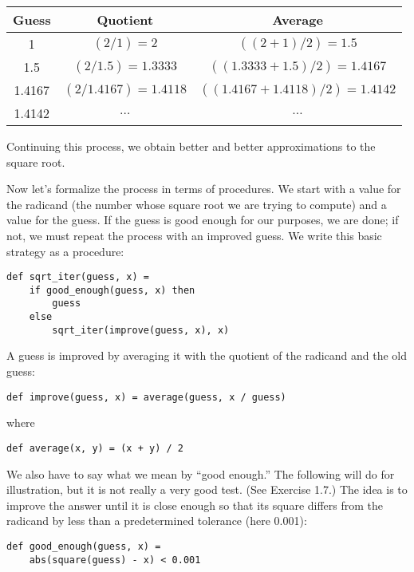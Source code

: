 \begin{center}
\begin{tabular}{|c|c|c|}
\hline
Guess & Quotient & Average \\
\hline
1 & $(2/1) = 2$ & $((2 + 1)/2) = 1.5$ \\
1.5 & $(2/1.5) = 1.3333$ & $((1.3333 + 1.5)/2) = 1.4167$ \\
1.4167 & $(2/1.4167) = 1.4118$ & $((1.4167 + 1.4118)/2) = 1.4142$ \\
1.4142 & $\ldots$ & $\ldots$ \\
\hline
\end{tabular}
\end{center}

Continuing this process, we obtain better and better approximations to the square root.

Now let's formalize the process in terms of procedures. We start with a value for the radicand (the number whose square root we are trying to compute) and a value for the guess. If the guess is good enough for our purposes, we are done; if not, we must repeat the process with an improved guess. We write this basic strategy as a procedure:

\begin{lstlisting}
def sqrt_iter(guess, x) =
    if good_enough(guess, x) then
        guess
    else
        sqrt_iter(improve(guess, x), x)
\end{lstlisting}

A guess is improved by averaging it with the quotient of the radicand and the old guess:

\begin{lstlisting}
def improve(guess, x) = average(guess, x / guess)
\end{lstlisting}

where

\begin{lstlisting}
def average(x, y) = (x + y) / 2
\end{lstlisting}

We also have to say what we mean by ``good enough.'' The following will do for illustration, but it is not really a very good test. (See Exercise 1.7.) The idea is to improve the answer until it is close enough so that its square differs from the radicand by less than a predetermined tolerance (here 0.001):

\begin{lstlisting}
def good_enough(guess, x) =
    abs(square(guess) - x) < 0.001
\end{lstlisting}

